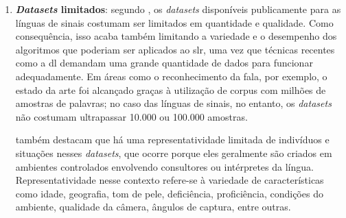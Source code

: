 \begin{enumerate}



      \item \textbf{\textit{Datasets} limitados}:
            segundo , os \textit{datasets} disponíveis publicamente para as línguas de sinais costumam ser limitados em quantidade e qualidade.
            Como consequência, isso acaba também limitando a variedade e o desempenho dos algoritmos que poderiam ser aplicados ao \acrshort{slr}, uma vez que técnicas recentes como a \acrlong{dl} demandam uma grande quantidade de dados para funcionar adequadamente.
            Em áreas como o reconhecimento da fala, por exemplo, o estado da arte foi alcançado graças à utilização de corpus com milhões de amostras de palavras; no caso das línguas de sinais, no entanto, os \textit{datasets} não costumam ultrapassar 10.000 ou 100.000 amostras.




             também destacam que há uma representatividade limitada de indivíduos e situações nesses \textit{datasets}, que ocorre porque eles geralmente são criados em ambientes controlados envolvendo consultores ou intérpretes da língua.
            Representatividade nesse contexto refere-se à variedade de características como idade, geografia, tom de pele, deficiência, proficiência, condições do ambiente, qualidade da câmera, ângulos de captura, entre outras.



\end{enumerate}
